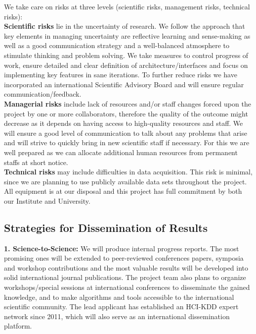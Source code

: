 \documentclass[a4paper,11pt]{article}
\begin{document}
We take care on risks at three levels (scientific risks, management risks, technical risks):
\\[0,2cm]
\textbf{Scientific risks} lie in the uncertainty of research. We follow the approach that key elements in managing uncertainty are reflective learning and sense-making as well as a good communication strategy and a well-balanced atmosphere to stimulate thinking and problem solving. 
We take measures to control progress of work, ensure detailed and clear definition of architecture/interfaces and focus on implementing key features in sane iterations. To further reduce risks we have incorporated an international Scientific Advisory Board and will ensure regular communication/feedback. 
\\[0,2cm]
\textbf{Managerial risks} include lack of resources and/or staff changes forced upon the project by one or more collaborators, therefore the quality of the outcome might decrease as it depends on having access to high-quality resources and staff. We will ensure a good level of communication to talk about any problems that arise and will strive to quickly bring in new scientific staff if necessary. For this we are well prepared as we can allocate additional human resources from permanent staffs at short notice.
\\[0,2cm]
\textbf{Technical risks} may include difficulties in data acquisition. This risk is minimal, since we are planning to use publicly available data sets throughout the project. All equipment is at our disposal and this project has full commitment by both our Institute and University.

\subsection{Strategies for Dissemination of Results}

\textbf{1. Science-to-Science:} We will produce internal progress reports. The most promising ones will be extended to peer-reviewed conferences papers, symposia and workshop contributions and the most valuable results will be developed into solid international journal publications. The project team also plans to organize workshops/special sessions at international conferences to disseminate the gained knowledge, and to make algorithms and tools accessible to the international scientific community. The lead applicant has established an HCI-KDD expert network since 2011, which will also serve as an international dissemination platform.
\end{document}
